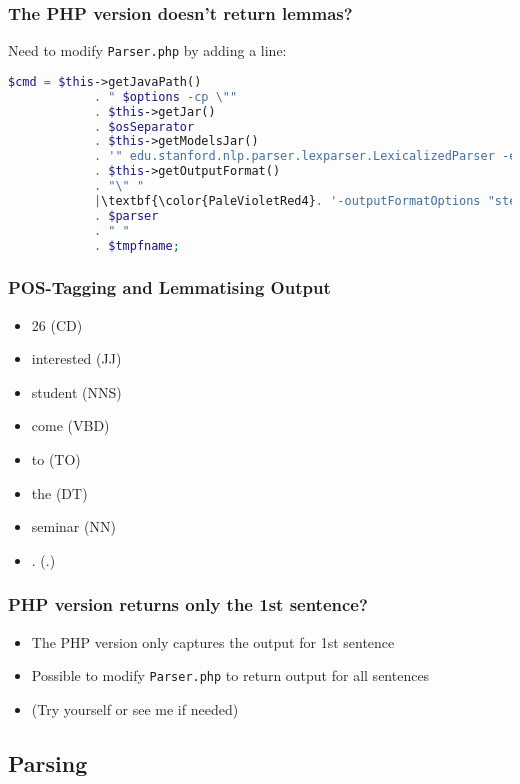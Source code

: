 \begin{frame}[fragile]
\frametitle{The PHP version doesn't return lemmas?}
    
Need to modify \texttt{Parser.php} by adding a line:

\begin{lstlisting}[language=PHP,gobble=8,escapechar=|,basicstyle=\ttfamily\small,frame=lines]
        $cmd = $this->getJavaPath()
            . " $options -cp \""
            . $this->getJar()
            . $osSeparator
            . $this->getModelsJar()
            . '" edu.stanford.nlp.parser.lexparser.LexicalizedParser -encoding UTF-8 -outputFormat "'
            . $this->getOutputFormat()
            . "\" "
            |\textbf{\color{PaleVioletRed4}. '-outputFormatOptions "stem" '}|
            . $parser
            . " "
            . $tmpfname;
\end{lstlisting}

\end{frame}

\begin{frame}
\frametitle{POS-Tagging and Lemmatising Output}
    
\begin{itemize}
\item 26 (CD)
\item interested (JJ)
\item student (NNS)
\item come (VBD)
\item to (TO)
\item the (DT)
\item seminar (NN)
\item . (.)
\end{itemize}

\end{frame}

\begin{frame}
\frametitle{PHP version returns only the 1st sentence?}
    
\begin{itemize}
\item The PHP version only captures the output for 1st sentence
\item Possible to modify \texttt{Parser.php} to return output for all sentences
\item (Try yourself or see me if needed)
\end{itemize}

\end{frame}

\subsection{Parsing}

